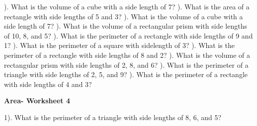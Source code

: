 \documentclass{article}%
\begin{document}
\newline%
\newline%
). What is the volume of a cube with a side length of 7?%
\newline%
\newline%
). What is the area of a rectangle with side lengths of 5 and 3?%
\newline%
\newline%
). What is the volume of a cube with a side length of 7?%
\newline%
\newline%
). What is the volume of a rectangular prism with side lengths of 10, 8, and 5?%
\newline%
\newline%
). What is the perimeter of a rectangle with side lengths of 9 and 1?%
\newline%
\newline%
). What is the perimeter of a square with sidelength of 3?%
\newline%
\newline%
). What is the perimeter of a rectangle with side lengths of 8 and 2?%
\newline%
\newline%
). What is the volume of a rectangular prism with side lengths of 2, 8, and 6?%
\newline%
\newline%
). What is the perimeter of a triangle with side lengths of 2, 5, and 9?%
\newline%
\newline%
). What is the perimeter of a rectangle with side lengths of 4 and 3?%
\newline%
\newline%
\newline%
\pagebreak%
\large%
\begin{center}%
\textbf{Area- Worksheet 4}%
\newline%
\end{center} \normalsize%
1). What is the perimeter of a triangle with side lengths of 8, 6, and 5?%
\end{document}
